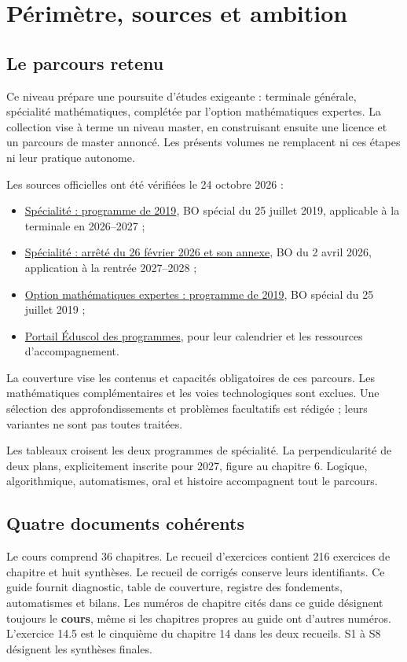\chapter{Périmètre, sources et ambition}
\section{Le parcours retenu}
Ce niveau prépare une poursuite d'études exigeante : terminale générale, spécialité mathématiques, complétée par l'option mathématiques expertes. La collection vise à terme un niveau master, en construisant ensuite une licence et un parcours de master annoncé. Les présents volumes ne remplacent ni ces étapes ni leur pratique autonome.

Les sources officielles ont été vérifiées le 24 octobre 2026 :
\begin{itemize}
\item \href{https://eduscol.education.gouv.fr/sites/default/files/document/spe246annexe1158907pdf-84159.pdf}{Spécialité : programme de 2019}, BO spécial du 25 juillet 2019, applicable à la terminale en 2026--2027 ;
\item \href{https://www.education.gouv.fr/bo/2026/Hebdo14/MENE2602919A}{Spécialité : arrêté du 26 février 2026 et son annexe}, BO du 2 avril 2026, application à la rentrée 2027--2028 ;
\item \href{https://eduscol.education.gouv.fr/sites/default/files/document/spe264annexe1158825pdf-84165.pdf}{Option mathématiques expertes : programme de 2019}, BO spécial du 25 juillet 2019 ;
\item \href{https://eduscol.education.gouv.fr/5817/programmes-et-ressources-en-mathematiques-voie-gt}{Portail Éduscol des programmes}, pour leur calendrier et les ressources d'accompagnement.
\end{itemize}
La couverture vise les contenus et capacités obligatoires de ces parcours. Les mathématiques complémentaires et les voies technologiques sont exclues. Une sélection des approfondissements et problèmes facultatifs est rédigée ; leurs variantes ne sont pas toutes traitées.

Les tableaux croisent les deux programmes de spécialité. La perpendicularité de deux plans, explicitement inscrite pour 2027, figure au chapitre 6. Logique, algorithmique, automatismes, oral et histoire accompagnent tout le parcours.
\section{Quatre documents cohérents}
Le cours comprend 36 chapitres. Le recueil d'exercices contient 216 exercices de chapitre et huit synthèses. Le recueil de corrigés conserve leurs identifiants. Ce guide fournit diagnostic, table de couverture, registre des fondements, automatismes et bilans.
Les numéros de chapitre cités dans ce guide désignent toujours le \textbf{cours}, même si les chapitres propres au guide ont d'autres numéros. L'exercice 14.5 est le cinquième du chapitre 14 dans les deux recueils. S1 à S8 désignent les synthèses finales.

